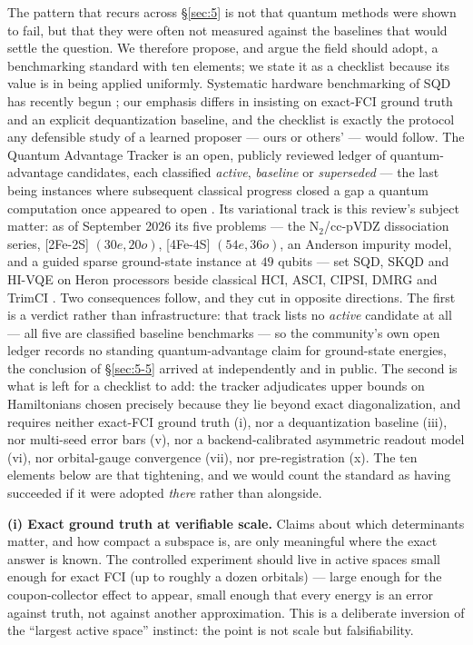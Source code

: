 \documentclass[onecolumn,a4paper]{quantumarticle}
\begin{document}
The pattern that recurs across \S\ref{sec:5} is not that quantum methods were shown to fail, but that they were often not measured against the baselines that would settle the question. We therefore propose, and argue the field should adopt, a benchmarking standard with ten elements; we state it as a checklist because its value is in being applied uniformly. Systematic hardware benchmarking of SQD has recently begun \cite{raisuddin2025}; our emphasis differs in insisting on exact-FCI ground truth and an explicit dequantization baseline, and the checklist is exactly the protocol any defensible study of a learned proposer --- ours or others' --- would follow. The Quantum Advantage Tracker is an open, publicly reviewed ledger of quantum-advantage candidates, each classified \emph{active}, \emph{baseline} or \emph{superseded} --- the last being instances where subsequent classical progress closed a gap a quantum computation once appeared to open \cite{qatracker}. Its variational track is this review's subject matter: as of September 2026 its five problems --- the N$_2$/cc-pVDZ dissociation series, [2Fe-2S] $(30e,20o)$, [4Fe-4S] $(54e,36o)$, an Anderson impurity model, and a guided sparse ground-state instance at $49$ qubits --- set SQD, SKQD and HI-VQE on Heron processors beside classical HCI, ASCI, CIPSI, DMRG and TrimCI \cite{zhangotten2025}. Two consequences follow, and they cut in opposite directions. The first is a verdict rather than infrastructure: that track lists no \emph{active} candidate at all --- all five are classified baseline benchmarks --- so the community's own open ledger records no standing quantum-advantage claim for ground-state energies, the conclusion of \S\ref{sec:5-5} arrived at independently and in public. The second is what is left for a checklist to add: the tracker adjudicates upper bounds on Hamiltonians chosen precisely because they lie beyond exact diagonalization, and requires neither exact-FCI ground truth (i), nor a dequantization baseline (iii), nor multi-seed error bars (v), nor a backend-calibrated asymmetric readout model (vi), nor orbital-gauge convergence (vii), nor pre-registration (x). The ten elements below are that tightening, and we would count the standard as having succeeded if it were adopted \emph{there} rather than alongside.

\textbf{(i) Exact ground truth at verifiable scale.} Claims about which determinants matter, and how compact a subspace is, are only meaningful where the exact answer is known. The controlled experiment should live in active spaces small enough for exact FCI (up to roughly a dozen orbitals) --- large enough for the coupon-collector effect to appear, small enough that every energy is an error against truth, not against another approximation. This is a deliberate inversion of the ``largest active space'' instinct: the point is not scale but falsifiability.
\end{document}
